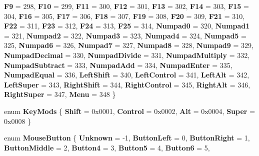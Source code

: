 \begin{DoxyCompactItemize}
{\bfseries F9} = 298, 
{\bfseries F10} = 299, 
{\bfseries F11} = 300, 
{\bfseries F12} = 301, 
\newline
{\bfseries F13} = 302, 
{\bfseries F14} = 303, 
{\bfseries F15} = 304, 
{\bfseries F16} = 305, 
\newline
{\bfseries F17} = 306, 
{\bfseries F18} = 307, 
{\bfseries F19} = 308, 
{\bfseries F20} = 309, 
\newline
{\bfseries F21} = 310, 
{\bfseries F22} = 311, 
{\bfseries F23} = 312, 
{\bfseries F24} = 313, 
\newline
{\bfseries F25} = 314, 
{\bfseries Numpad0} = 320, 
{\bfseries Numpad1} = 321, 
{\bfseries Numpad2} = 322, 
\newline
{\bfseries Numpad3} = 323, 
{\bfseries Numpad4} = 324, 
{\bfseries Numpad5} = 325, 
{\bfseries Numpad6} = 326, 
\newline
{\bfseries Numpad7} = 327, 
{\bfseries Numpad8} = 328, 
{\bfseries Numpad9} = 329, 
{\bfseries Numpad\+Decimal} = 330, 
\newline
{\bfseries Numpad\+Divide} = 331, 
{\bfseries Numpad\+Multiply} = 332, 
{\bfseries Numpad\+Subtract} = 333, 
{\bfseries Numpad\+Add} = 334, 
\newline
{\bfseries Numpad\+Enter} = 335, 
{\bfseries Numpad\+Equal} = 336, 
{\bfseries Left\+Shift} = 340, 
{\bfseries Left\+Control} = 341, 
\newline
{\bfseries Left\+Alt} = 342, 
{\bfseries Left\+Super} = 343, 
{\bfseries Right\+Shift} = 344, 
{\bfseries Right\+Control} = 345, 
\newline
{\bfseries Right\+Alt} = 346, 
{\bfseries Right\+Super} = 347, 
{\bfseries Menu} = 348
 \}
\item 
\mbox{\label{namespace_space_v_i_l_1_1_core_a28aa8993b057f34e570a8077e6da573f}} 
enum {\bfseries Key\+Mods} \{ {\bfseries Shift} = 0x0001, 
{\bfseries Control} = 0x0002, 
{\bfseries Alt} = 0x0004, 
{\bfseries Super} = 0x0008
 \}
\item 
\mbox{\label{namespace_space_v_i_l_1_1_core_a6bb294e102daf6d39abb93bad758851d}} 
enum {\bfseries Mouse\+Button} \{ \newline
{\bfseries Unknown} = -\/1, 
{\bfseries Button\+Left} = 0, 
{\bfseries Button\+Right} = 1, 
{\bfseries Button\+Middle} = 2, 
\newline
{\bfseries Button4} = 3, 
{\bfseries Button5} = 4, 
{\bfseries Button6} = 5, 

\end{DoxyCompactItemize}
